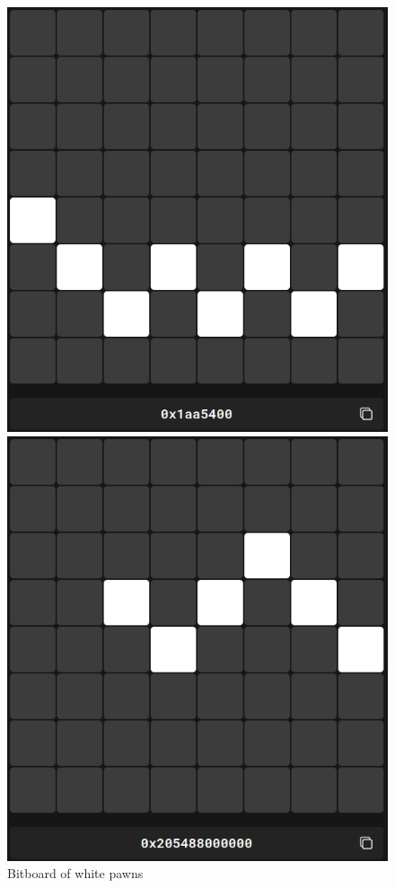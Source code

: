 \begin{figure}[H]
    \vspace{0.5cm}
    \begin{minipage}[c]{0.30\textwidth}
        \includegraphics[width=\textwidth]{Imagenes/bitboard_white_pawns.png}
        \caption*{Bitboard of white pawns}
    \end{minipage}
    \hfill
    \begin{minipage}[c]{0.30\textwidth}
        \includegraphics[width=\textwidth]{Imagenes/bitboard_black_pawns.png}

\end{minipage}
\end{figure}
